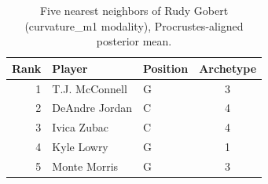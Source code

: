 \begin{table}[htbp]
  \centering\small
  \begin{tabular}{rllc}
    \toprule
    Rank & Player & Position & Archetype \\
    \midrule
    1 & T.J. McConnell & G & 3 \\
    2 & DeAndre Jordan & C & 4 \\
    3 & Ivica Zubac & C & 4 \\
    4 & Kyle Lowry & G & 1 \\
    5 & Monte Morris & G & 3 \\
    \bottomrule
  \end{tabular}
  \caption{Five nearest neighbors of Rudy Gobert (curvature_m1 modality), Procrustes-aligned posterior mean.}
  \label{tab:Rudy_Gobert_neighbors_curvature_m1}
\end{table}

